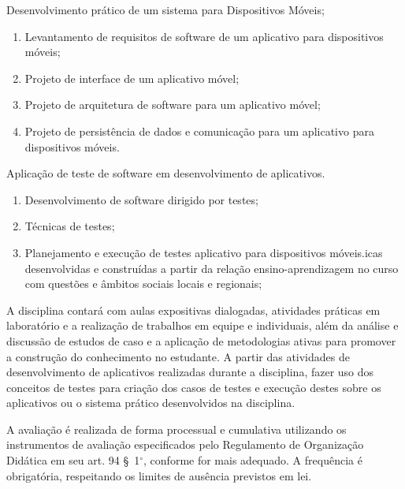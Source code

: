 \begin{pud}
\begin{description}[itemsep=0em]
		\item[UNIDADE VII:] Desenvolvimento prático de um sistema para Dispositivos Móveis; 
	         \begin{enumerate}[itemsep=0em, topsep=0em]
				\item  Levantamento de requisitos de software de um aplicativo para dispositivos móveis;
	            \item  Projeto de interface de um aplicativo móvel;
	            \item  Projeto de arquitetura de software para um aplicativo móvel;
	            \item  Projeto de persistência de dados e comunicação para um aplicativo para dispositivos móveis.
            \end{enumerate}
            
        \item[UNIDADE VIII:] Aplicação de teste de software em desenvolvimento de aplicativos.
	         \begin{enumerate}[itemsep=0em, topsep=0em]
				\item  Desenvolvimento de software dirigido por testes;
				\item Técnicas de testes;
				\item Planejamento e execução de testes aplicativo para dispositivos móveis.icas desenvolvidas e construídas a partir da relação ensino-aprendizagem no curso com questões e âmbitos sociais locais e regionais;
                
            \end{enumerate}                                    

	\end{description}
	
	\metodologia
	A disciplina contará com aulas expositivas dialogadas, atividades práticas em laboratório e a realização de trabalhos em equipe e individuais, além da análise e discussão de estudos de caso e a aplicação de metodologias ativas para promover a construção do conhecimento no estudante. A partir das atividades de desenvolvimento de aplicativos realizadas durante a disciplina, fazer uso dos conceitos de testes para criação dos casos de testes e execução destes sobre os aplicativos ou o sistema prático desenvolvidos na disciplina.
	
	\avaliacao
	A avaliação é realizada de forma processual e cumulativa utilizando os instrumentos de avaliação especificados pelo Regulamento de Organização Didática em seu art. 94 \S~1$^\circ$, conforme for mais adequado. A frequência é obrigatória, respeitando os limites de ausência previstos em lei.
	\naopresencial
	

\end{pud}
